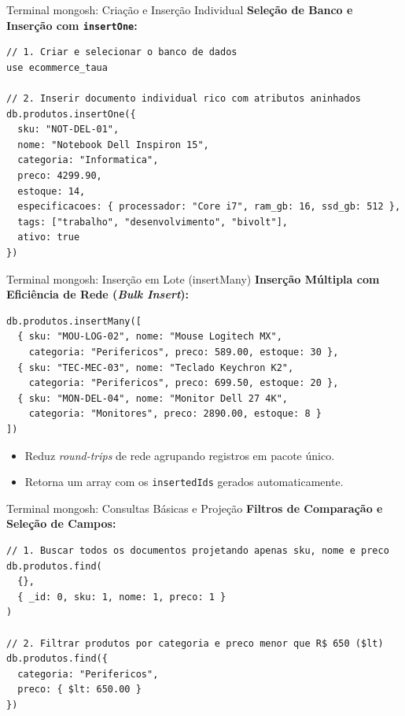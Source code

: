 \begin{frame}[fragile]{Terminal mongosh: Criação e Inserção Individual}
  \textbf{Seleção de Banco e Inserção com \texttt{insertOne}:}
\begin{lstlisting}[basicstyle=\ttfamily\scriptsize]
// 1. Criar e selecionar o banco de dados
use ecommerce_taua

// 2. Inserir documento individual rico com atributos aninhados
db.produtos.insertOne({
  sku: "NOT-DEL-01",
  nome: "Notebook Dell Inspiron 15",
  categoria: "Informatica",
  preco: 4299.90,
  estoque: 14,
  especificacoes: { processador: "Core i7", ram_gb: 16, ssd_gb: 512 },
  tags: ["trabalho", "desenvolvimento", "bivolt"],
  ativo: true
})
\end{lstlisting}
\end{frame}

\begin{frame}[fragile]{Terminal mongosh: Inserção em Lote (insertMany)}
  \textbf{Inserção Múltipla com Eficiência de Rede (\textit{Bulk Insert}):}
\begin{lstlisting}[basicstyle=\ttfamily\scriptsize]
db.produtos.insertMany([
  { sku: "MOU-LOG-02", nome: "Mouse Logitech MX",
    categoria: "Perifericos", preco: 589.00, estoque: 30 },
  { sku: "TEC-MEC-03", nome: "Teclado Keychron K2",
    categoria: "Perifericos", preco: 699.50, estoque: 20 },
  { sku: "MON-DEL-04", nome: "Monitor Dell 27 4K",
    categoria: "Monitores", preco: 2890.00, estoque: 8 }
])
\end{lstlisting}
  {\footnotesize
  \begin{itemize}
    \item Reduz \textit{round-trips} de rede agrupando registros em pacote único.
    \item Retorna um array com os \texttt{insertedIds} gerados automaticamente.
  \end{itemize}
  }
\end{frame}

\begin{frame}[fragile]{Terminal mongosh: Consultas Básicas e Projeção}
  \textbf{Filtros de Comparação e Seleção de Campos:}
\begin{lstlisting}[basicstyle=\ttfamily\scriptsize]
// 1. Buscar todos os documentos projetando apenas sku, nome e preco
db.produtos.find(
  {},
  { _id: 0, sku: 1, nome: 1, preco: 1 }
)

// 2. Filtrar produtos por categoria e preco menor que R$ 650 ($lt)
db.produtos.find({
  categoria: "Perifericos",
  preco: { $lt: 650.00 }
})
\end{lstlisting}
\end{frame}

